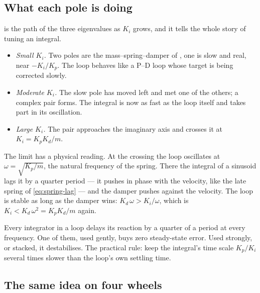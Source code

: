 \subsection{What each pole is doing}
 is the path of the three eigenvalues as $K_i$ grows, and it tells the whole story of tuning an integral.
\begin{itemize}
  \item \emph{Small $K_i$.} Two poles are the mass–spring–damper of , one is slow and real, near $-K_i/K_p$. The loop behaves like a P–D loop whose target is being corrected slowly.
  \item \emph{Moderate $K_i$.} The slow pole has moved left and met one of the others; a complex pair forms. The integral is now as fast as the loop itself and takes part in its oscillation.
  \item \emph{Large $K_i$.} The pair approaches the imaginary axis and crosses it at $K_i = K_pK_d/m$.
\end{itemize}
The limit has a physical reading. At the crossing the loop oscillates at $\omega = \sqrt{K_p/m}$, the natural frequency of the spring. There the integral of a sinusoid lags it by a quarter period — it pushes in phase with the velocity, like the late spring of \cref{eq:spring-lag} — and the damper pushes against the velocity. The loop is stable as long as the damper wins: $K_d\,\omega > K_i/\omega$, which is $K_i < K_d\,\omega^2 = K_pK_d/m$ again.

\begin{keyidea}
Every integrator in a loop delays its reaction by a quarter of a period at every frequency. One of them, used gently, buys zero steady-state error. Used strongly, or stacked, it destabilises. The practical rule: keep the integral's time scale $K_p/K_i$ several times slower than the loop's own settling time.
\end{keyidea}

\subsection{The same idea on four wheels}

